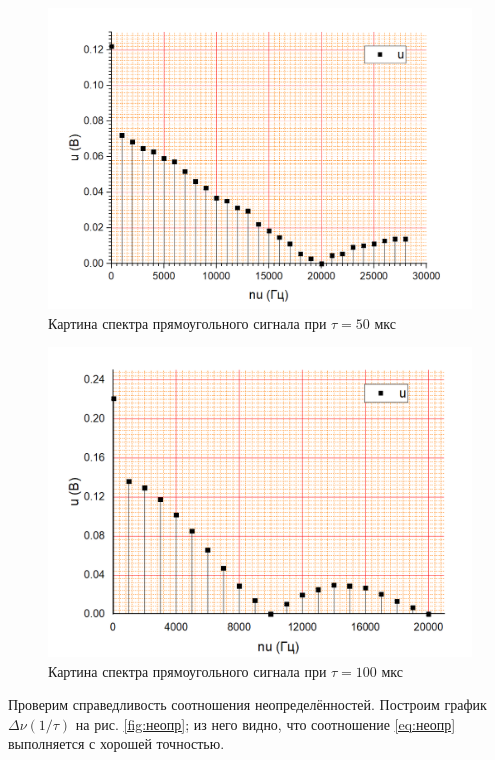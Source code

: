 \documentclass[a4paper]{article}
\begin{document}
\begin{figure}[p]
	\centering
	\includegraphics[width=0.8\linewidth]{"1кгц 50мкс"}
	\caption{Картина спектра прямоугольного сигнала при $\tau = 50$ мкс}
	\label{fig:1-50}
\end{figure}

\begin{figure}[p]
	\centering
	\includegraphics[width=0.8\linewidth]{"1кгц 100мкс"}
	\caption{Картина спектра прямоугольного сигнала при $\tau = 100$ мкс}
	\label{fig:1-100}
\end{figure}

Проверим справедливость соотношения неопределённостей. Построим график $ \Delta \nu (1/\tau) $ на рис. \ref{fig:неопр}; из него видно, что соотношение \eqref{eq:неопр} выполняется с хорошей точностью.
\end{document}
